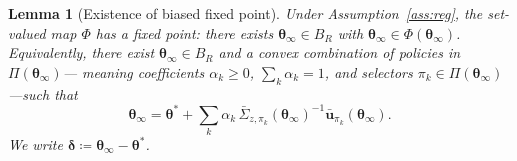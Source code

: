 \documentclass[11pt]{article}
\newtheorem{lemma}[theorem]{Lemma}
\begin{document}
\begin{lemma}[Existence of biased fixed point]\label{lem:fp}
Under Assumption~\ref{ass:reg}, the set-valued map $\Phi$ has a fixed
point: there exists $\bm{\theta}_\infty\in B_R$ with
$\bm{\theta}_\infty\in\Phi(\bm{\theta}_\infty)$.
Equivalently, there exist $\bm{\theta}_\infty\in B_R$ and a
\emph{convex combination} of policies in $\Pi(\bm{\theta}_\infty)$---
meaning coefficients $\alpha_k\geq 0$, $\sum_k\alpha_k=1$, and
selectors $\pi_k\in\Pi(\bm{\theta}_\infty)$---such that
\begin{equation}
\bm{\theta}_\infty=\bm{\theta}^{\!*}+
\sum_k\alpha_k\,\bar{\Sigma}_{z,\pi_k}(\bm{\theta}_\infty)^{-1}
\bar{\bm{u}}_{\pi_k}(\bm{\theta}_\infty).
\label{eq:fp_conv}
\end{equation}
We write $\bm{\delta}\coloneqq\bm{\theta}_\infty-\bm{\theta}^{\!*}$.
\end{lemma}
\end{document}
